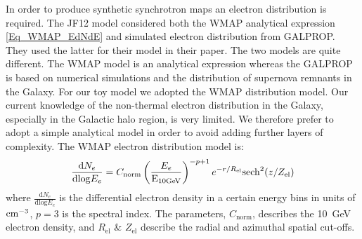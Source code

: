 \documentclass[12pt, a4 paper]{article}
\begin{document}
In order to produce synthetic synchrotron maps an electron distribution is required.
The JF12 model considered both the WMAP analytical expression \ref{Eq_WMAP_EdNdE}
and simulated electron distribution from GALPROP. They used the latter for their model in their paper.
The two models are quite different. The WMAP \cite{WMAP_Page} model is an analytical expression whereas the GALPROP \cite{Hammurabi} is based on numerical simulations and the distribution of supernova remnants in the Galaxy. For our toy model we adopted the WMAP distribution model. Our current knowledge of the non-thermal electron distribution in the Galaxy, especially in the Galactic halo region, is very limited. We therefore prefer to adopt a simple analytical model in order to avoid adding further layers of complexity. The WMAP electron distribution model is:
\begin{equation}\label{Eq_WMAP_EdNdE}
    \frac{\mathrm{d}N_e}{\mathrm{dlog}E_{e}} =     C_\mathrm{norm} \left(\frac{E_e}{\rm E_{\rm 10 GeV}}\right)^{-p+1} e^{-r/R_{\mathrm{el}}} \mathrm{sech}^2(z/Z_{\mathrm{el}}) 
\end{equation}
where $\frac{\mathrm{d}N_e}{\mathrm{dlog}E_{e}}$ is the differential electron density in a certain energy bins
in units of ${\rm cm}^{-3}$, $p =3$ is the spectral index. The parameters, $C_\mathrm{norm}$, describes the 10~GeV electron density, and $R_{\mathrm{el}}$ \& $Z_{\mathrm{el}}$ describe the radial and azimuthal spatial cut-offs. 
\end{document}
